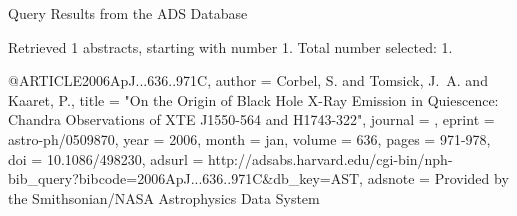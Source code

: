 Query Results from the ADS Database


Retrieved 1 abstracts, starting with number 1.  Total number selected: 1.

@ARTICLE{2006ApJ...636..971C,
   author = {{Corbel}, S. and {Tomsick}, J.~A. and {Kaaret}, P.},
    title = "{On the Origin of Black Hole X-Ray Emission in Quiescence: Chandra Observations of XTE J1550-564 and H1743-322}",
  journal = {\apj},
   eprint = {astro-ph/0509870},
     year = 2006,
    month = jan,
   volume = 636,
    pages = {971-978},
      doi = {10.1086/498230},
   adsurl = {http://adsabs.harvard.edu/cgi-bin/nph-bib_query?bibcode=2006ApJ...636..971C&db_key=AST},
  adsnote = {Provided by the Smithsonian/NASA Astrophysics Data System}
}


